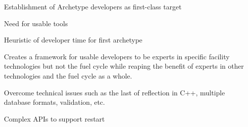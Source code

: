 Establishment of Archetype developers as first-class target

Need for usable tools

Heuristic of developer time for first archetype

Creates a framework for usable developers to be experts in specific facility 
technologies but not the fuel cycle while reaping the benefit of experts in 
other technologies and the fuel cycle as a whole.

Overcome technical issues such as the last of reflection in C++, multiple 
database formats, validation, etc.

Complex APIs to support restart
